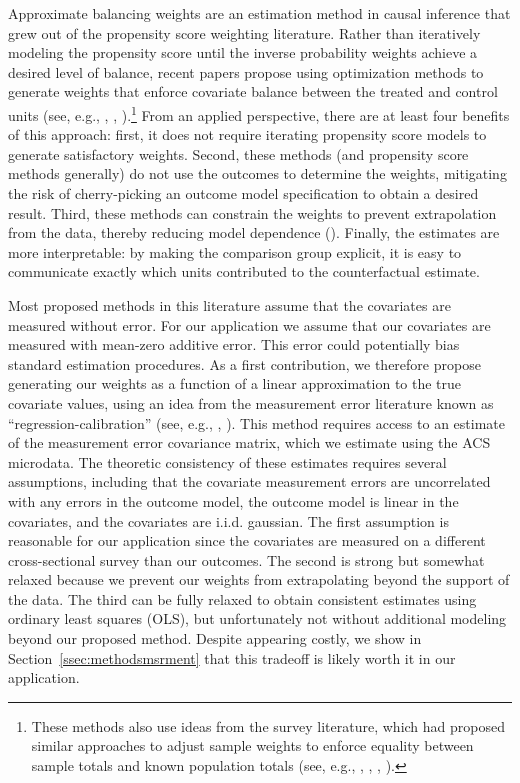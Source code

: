 \documentclass[aoas]{imsart}
\theoremstyle{plain}
\theoremstyle{remark}
\begin{document}
Approximate balancing weights are an estimation method in causal inference that grew out of the propensity score weighting literature. Rather than iteratively modeling the propensity score until the inverse probability weights achieve a desired level of balance, recent papers propose using optimization methods to generate weights that enforce covariate balance between the treated and control units (see, e.g., \cite{hainmueller2012entropy}, \cite{imai2014covariate}, \cite{zubizarreta2015stable}).\footnote{These methods also use ideas from the survey literature, which had proposed similar approaches to adjust sample weights to enforce equality between sample totals and known population totals (see, e.g., \cite{haberman1984adjustment}, \cite{deville1992calibration}, \cite{deville1993generalized}, \cite{sarndal2005estimation}).} From an applied perspective, there are at least four benefits of this approach: first, it does not require iterating propensity score models to generate satisfactory weights. Second, these methods (and propensity score methods generally) do not use the outcomes to determine the weights, mitigating the risk of cherry-picking an outcome model specification to obtain a desired result. Third, these methods can constrain the weights to prevent extrapolation from the data, thereby reducing model dependence (\cite{zubizarreta2015stable}). Finally, the estimates are more interpretable: by making the comparison group explicit, it is easy to communicate exactly which units contributed to the counterfactual estimate.

Most proposed methods in this literature assume that the covariates are measured without error. For our application we assume that our covariates are measured with mean-zero additive error. This error could potentially bias standard estimation procedures. As a first contribution, we therefore propose generating our weights as a function of a linear approximation to the true covariate values, using an idea from the measurement error literature known as ``regression-calibration'' (see, e.g., \cite{gleser1992importance}, \cite{carroll2006measurement}). This method requires access to an estimate of the measurement error covariance matrix, which we estimate using the ACS microdata. The theoretic consistency of these estimates requires several assumptions, including that the covariate measurement errors are uncorrelated with any errors in the outcome model, the outcome model is linear in the covariates, and the covariates are i.i.d. gaussian. The first assumption is reasonable for our application since the covariates are measured on a different cross-sectional survey than our outcomes. The second is strong but somewhat relaxed because we prevent our weights from extrapolating beyond the support of the data. The third can be fully relaxed to obtain consistent estimates using ordinary least squares (OLS), but unfortunately not without additional modeling beyond our proposed method. Despite appearing costly, we show in Section~\ref{ssec:methodsmsrment} that this tradeoff is likely worth it in our application.
\end{document}
